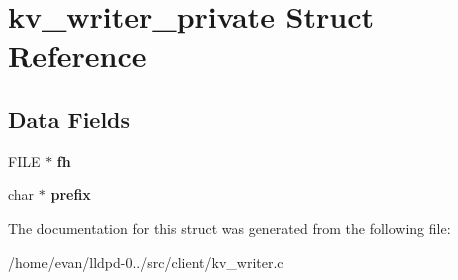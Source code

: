 \section{kv\-\_\-writer\-\_\-private \-Struct \-Reference}
\label{structkv__writer__private}
\subsection*{\-Data \-Fields}
\begin{DoxyCompactItemize}
\item 
\-F\-I\-L\-E $\ast$ {\bfseries fh}\label{structkv__writer__private_a77679c3e1b0f04ed2c76e00e41363351}

\item 
char $\ast$ {\bfseries prefix}\label{structkv__writer__private_ad2849cf781a4db22cc1b31eaaee50a4f}

\end{DoxyCompactItemize}


\-The documentation for this struct was generated from the following file\-:\begin{DoxyCompactItemize}
\item 
/home/evan/lldpd-\/0../src/client/kv\-\_\-writer.\-c\end{DoxyCompactItemize}
